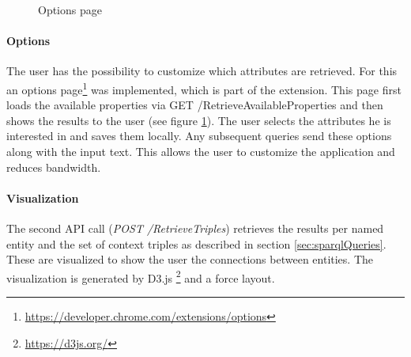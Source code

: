 \begin{figure}
  \caption{Options page}
  \label{fig:options}
\end{figure}

\paragraph{Options}
The user has the possibility to customize which attributes are retrieved. For this an options page\footnote{\url{https://developer.chrome.com/extensions/options}} was implemented, which is part of the extension. This page first loads the available properties via GET /RetrieveAvailableProperties and then shows the results to the user (see figure \ref{fig:options}). The user selects the attributes he is interested in and saves them locally. Any subsequent queries send these options along with the input text. This allows the user to customize the application and reduces bandwidth.

\paragraph{Visualization}
The second API call (\textit{POST /RetrieveTriples}) retrieves the results per named entity and the set of context triples as described in section \ref{sec:sparqlQueries}. These are visualized to show the user the connections between entities. The visualization is generated by D3.js \footnote{\url{https://d3js.org/}} and a force layout. 































